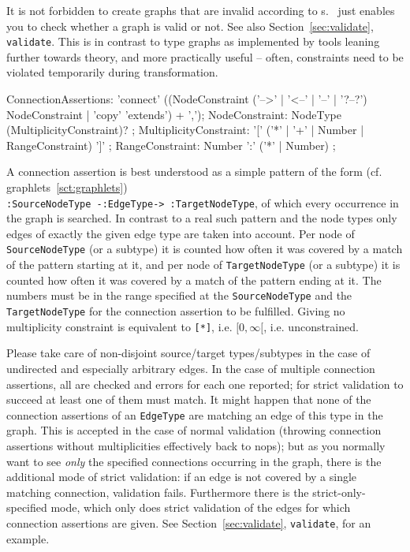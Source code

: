\begin{warning}
It is not forbidden to create graphs that are invalid according to s.
\GrG\ just enables you to check whether a graph is valid or not.
See also Section~\ref{sec:validate}, \texttt{validate}.
This is in contrast to type graphs as implemented by tools leaning further towards theory, and more practically useful -- often, constraints need to be violated temporarily during transformation. 
\end{warning}

\begin{rail}
  ConnectionAssertions: 'connect' ((NodeConstraint ('-->' | '<--' | '--' | '?--?') NodeConstraint | 'copy' 'extends') + ',');
  NodeConstraint: NodeType (MultiplicityConstraint)? ;
  MultiplicityConstraint: '[' ('*' | '+' | Number | RangeConstraint) ']' ;
  RangeConstraint: Number ':' ('*' | Number) ;
\end{rail}\label{sct:ConnectionAssertions}

\pagebreak

A connection assertion is best understood as a simple pattern of the form (cf. graphlets~\ref{sct:graphlets})\\
\texttt{:SourceNodeType -:EdgeType-> :TargetNodeType}, of which every occurrence in the graph is searched.
In contrast to a real such pattern and the node types only edges of exactly the given edge type are taken into account.
Per node of \texttt{SourceNodeType} (or a subtype) it is counted how often it was covered by a match of the pattern starting at it,
and per node of \texttt{TargetNodeType} (or a subtype) it is counted how often it was covered by a match of the pattern ending at it.
The numbers must be in the range specified at the \texttt{SourceNodeType} and the \texttt{TargetNodeType} for the connection assertion to be fulfilled.
Giving no multiplicity constraint is equivalent to \verb#[*]#, i.e. $[0,\infty[$, i.e. unconstrained.

Please take care of non-disjoint source/target types/subtypes in the case of undirected and especially arbitrary edges.
In the case of multiple connection assertions, all are checked and errors for each one reported; for strict validation to succeed at least one of them must match.
It might happen that none of the connection assertions of an \texttt{EdgeType} are matching an edge of this type in the graph.
This is accepted in the case of normal validation (throwing connection assertions without multiplicities effectively back to nops);
but as you normally want to see \emph{only} the specified connections occurring in the graph,
there is the additional mode of strict validation: if an edge is not covered by a single matching connection, validation fails.
Furthermore there is the strict-only-specified mode, which only does strict validation of the edges for which connection assertions are given.
See Section~\ref{sec:validate}, \texttt{validate}, for an example.

